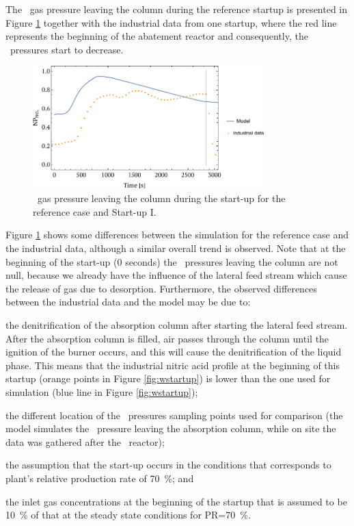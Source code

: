 \documentclass[journal=jacsat,manuscript=article]{achemso}
\newcommand{\nox}{\ce{NO_{\rmfamily{x}}}}
\newcommand{\envinox}{\text{Envi\nox\textsuperscript{\tiny\textregistered}}}
\begin{document}
The \nox~gas pressure leaving the column during the reference startup is presented in Figure \ref{fig:modelCUF1} together with the industrial data from one startup, where the red line represents the beginning of the abatement reactor and consequently, the \nox~pressures start to decrease.
\begin{figure}[htb]
	\centering
	\includegraphics[width=0.8\textwidth]{figure5}
	\caption{\nox~gas pressure leaving the column during the start-up for the reference case and Start-up I.} 	
	\label{fig:modelCUF1}
\end{figure}
Figure \ref{fig:modelCUF1} shows some differences between the simulation for the reference case and the industrial data, although a similar overall trend is observed. Note that at the beginning of the start-up (0 seconds) the \nox~pressures leaving the column are not null, because we already have the influence of the lateral feed stream which cause the release of gas due to desorption. Furthermore, the observed differences between the industrial data and the model may be due to:
\begin{inparaenum}[(i)]
	\item the denitrification of the absorption column after starting the lateral feed stream. After the absorption column is filled, air passes through the column until the ignition of the burner occurs, and this will cause the denitrification of the liquid phase. This means that the industrial nitric acid profile at the beginning of this startup (orange points in Figure \ref{fig:wstartup}) is lower than the one used for simulation (blue line in Figure \ref{fig:wstartup});
	\item the different location of the \nox~pressures sampling points used for comparison (the model simulates the \nox~pressure leaving the absorption column, while on site the data was gathered after the \envinox~reactor);
	\item the assumption that the start-up occurs in the conditions that corresponds to plant's relative production rate of \SI{70}{\percent}; and
	\item the inlet gas concentrations at the beginning of the startup that is assumed to be \SI{10}{\percent} of that at the steady state conditions for PR=\SI{70}{\percent}. 
\end{inparaenum}
\end{document}
